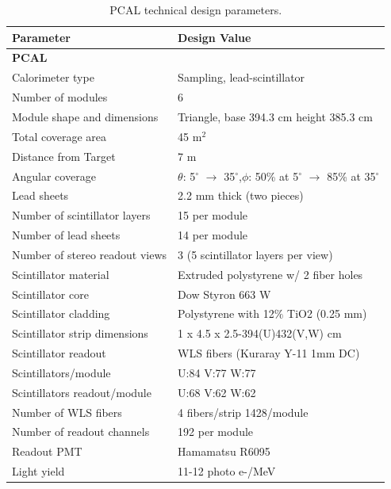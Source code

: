 \documentclass[letterpaper,10pt]{article}
\begin{document}
\begin{table}[htbp]
\begin{center}
\begin{tabular}{|l|l|} \hline
{\bf Parameter}        & {\bf Design Value} \\ \hline \hline
{\bf PCAL}         &              \\ \hline 
Calorimeter type   & Sampling, lead-scintillator \\ \hline
Number of modules  & 6 \\ \hline
Module shape and dimensions & Triangle, base 394.3 cm height 385.3 cm \\ \hline
Total coverage area      &  45 m$^2$ \\ \hline
Distance from Target & 7 m \\ \hline
Angular coverage   & $\theta$: 5$^\circ$ $\to$ 35$^\circ$,$\phi$: 50\% at 5$^\circ$ $\to$ 85\% at 35$^\circ$ \\ \hline
Lead sheets & 2.2 mm thick (two pieces) \\ \hline
Number of scintillator layers & 15 per module \\ \hline
Number of lead sheets  & 14 per module \\ \hline
Number of stereo readout views & 3 (5 scintillator layers per view) \\ \hline
Scintillator material & Extruded polystyrene w/ 2 fiber holes\\ \hline
Scintillator core & Dow Styron 663 W \\ \hline
Scintillator cladding & Polystyrene with 12$\%$ TiO2 (0.25 mm) \\ \hline
Scintillator strip dimensions & 1 x 4.5 x 2.5-394(U)432(V,W) cm \\ \hline
Scintillator readout & WLS fibers (Kuraray Y-11 1mm DC) \\ \hline
Scintillators/module & U:84 V:77 W:77 \\ \hline
Scintillators readout/module & U:68 V:62 W:62 \\ \hline
Number of WLS fibers & 4 fibers/strip 1428/module \\ \hline
Number of readout channels & 192 per module \\ \hline
Readout PMT & Hamamatsu R6095 \\ \hline
Light yield & 11-12 photo e-/MeV \\ \hline 
\end{tabular}
\end{center}
\caption{PCAL technical design parameters.} 
\end{table}
\end{document}
